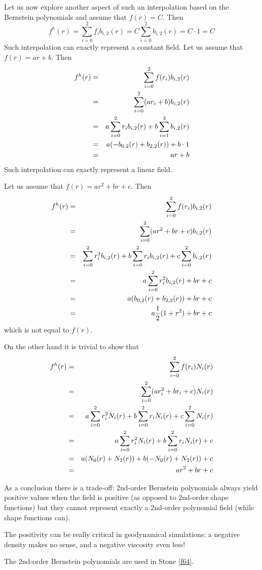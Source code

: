 Let us now explore another aspect of such an interpolation based on the Bernstein polynomials
and assume that $f(r)=C$. Then 
\[
f^h(r) = \sum_{i=0}^2 f_i b_{i,2}(r) = C \sum_{i=0}^2 b_{i,2}(r) = C \cdot 1 = C
\]
Such interpolation can exactly represent a constant field. 
Let us assume that $f(r)=ar+b$. Then 
\begin{eqnarray}
f^h(r) 
&=& \sum_{i=0}^2 f(r_i) b_{i,2}(r)  \nonumber\\
&=& \sum_{i=0}^2 (ar_i+b) b_{i,2}(r) \nonumber\\
&=& a\sum_{i=0}^2 r_i b_{i,2}(r) + b \sum_{i=1}^3 b_{i,2}(r) \nonumber\\
&=& a (-b_{0,2}(r)+b_{2,2}(r)) + b \cdot 1 \nonumber\\
&=& ar+b 
\end{eqnarray}
Such interpolation can exactly represent a linear field. 

Let us assume that $f(r)=ar^2+br+c$. Then 
\begin{eqnarray}
f^h(r) 
&=& \sum_{i=0}^2 f(r_i) b_{i,2}(r) \nonumber \\
&=& \sum_{i=0}^2 (ar^2+br+c) b_{i,2}(r) \nonumber\\
&=& \sum_{i=0}^2 r_i^2 b_{i,2}(r) + b \sum_{i=0}^2 r_i b_{i,2}(r) + c \sum_{i=0}^2 b_{i,2}(r) \nonumber\\
&=& a\sum_{i=0}^2 r_i^2 b_{i,2}(r) + br + c \nonumber\\
&=& a (b_{0,2}(r) + b_{2,2}(r)) + br + c \nonumber\\
&=& a\frac{1}{2}(1+r^2)  + br + c 
\end{eqnarray}
which is not equal to $f(r)$.

On the other hand it is trivial to show that 
\begin{eqnarray}
f^h(r) 
&=&  \sum_{i=0}^2 f(r_i) N_i(r) \nonumber \\
&=&  \sum_{i=0}^2   (ar_i^2+br_i+c)  N_i(r) \nonumber \\
&=&  a \sum_{i=0}^2  r_i^2 N_i(r) + b \sum_{i=0}^2 r_i  N_i(r) +  c \sum_{i=0}^2  N_i(r) \nonumber \\
&=&  a \sum_{i=0}^2  r_i^2 N_i(r) + b \sum_{i=0}^2 r_i  N_i(r) +  c \nonumber\\
&=&  a (N_0(r)+N_2(r)) + b (-N_0(r) +N_2(r)) +  c \nonumber\\
&=&  a r^2  + b r+ c 
\end{eqnarray}

As a conclusion there is a trade-off: 2nd-order Bernstein polynomials always yield positive 
values when the field is positive (as opposed to 2nd-order shape functions) but they cannot 
represent exactly a 2nd-order polynomial field (while shape functions can).

The positivity can be really critical in geodynamical simulations: a negative density makes no sense, 
and a negative viscosity even less!

The 2nd-order Bernstein polynomials are used in Stone \ref{f64}.
 







 

